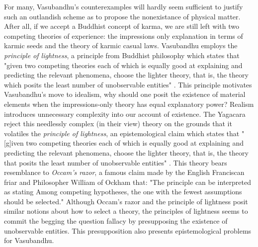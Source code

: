 For many, Vasubandhu's counterexamples will hardly seem sufficient to justify such an outlandish scheme as to propose the nonexistance of physical matter. After all, if we accept a Buddhist concept of karma, we are still left with two competing theories of experience: the impressions only explanation in terms of karmic seeds and the theory of karmic casual laws. \cite{siderits2007buddhism} Vasubandhu employs the \textit{principle of lightness}, a principle from Buddhist philosophy which states that "given two competing theories each of which is equally good at explaining and predicting the relevant phenomena, choose the lighter theory, that is, the theory which posits the least number of unobservable entities" \cite{siderits2007buddhism}. This principle motivates Vasubandhu's move to idealism, why should one posit the existence of material elements when the impressions-only theory has equal explanatory power? Realism introduces unnecessary complexity into our account of existence. The Yagacara reject this needlessly complex (in their view) theory on the grounds that it volatiles the \textit{principle of lightness}, an epistemological claim which states that "[g]iven two competing theories each of which is equally good at explaining and predicting the relevant phenomena, choose the lighter theory, that is, the theory that posits the least number of unobservable entities" \cite{siderits2007buddhism}. This theory bears resemblance to \textit{Occam's razor}, a famous claim made by the English Franciscan friar and Philosopher William of Ockham that:
"The principle can be interpreted as stating Among competing hypotheses, the one with the fewest assumptions should be selected."
Although Occam's razor and the principle of lightness posit similar notions about how to select a theory, the principles of lightness seems to commit the begging the question fallacy by presupposing the existence of unobservable entities. This presupposition also presents epistemological problems for Vasubandhu.  


